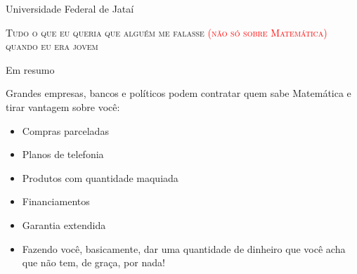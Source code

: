 \documentclass[]{beamer}
\begin{document}
\begin{frame}[t]{\centering Universidade Federal de Jataí}

  
\begin{center}
  \textsc{\huge{Tudo o que eu queria que alguém me falasse
      \textcolor{red}{(não só sobre Matemática)} quando eu era jovem}}
  \end{center}
  

\end{frame}


\begin{frame}{Em resumo}

\begin{tcolorbox}[
  colback=black!10!white, %
  colframe=black!70!white, %
  colupper=red!75!black, %
  collower=blue!75!black, %
  title= Ninguém vai saber Matemática pra você]
  Grandes empresas, bancos e políticos podem contratar quem
  sabe Matemática e tirar vantagem sobre você:
  \tcblower
  \begin{itemize}
  \item Compras parceladas
  \item Planos de telefonia
  \item Produtos com quantidade maquiada
  \item Financiamentos
  \item Garantia extendida
  \item Fazendo você, basicamente, dar uma quantidade de dinheiro que você
    acha que não tem, de graça,
    por nada!
  \end{itemize}
\end{tcolorbox}
  



\end{frame}

\end{document}

